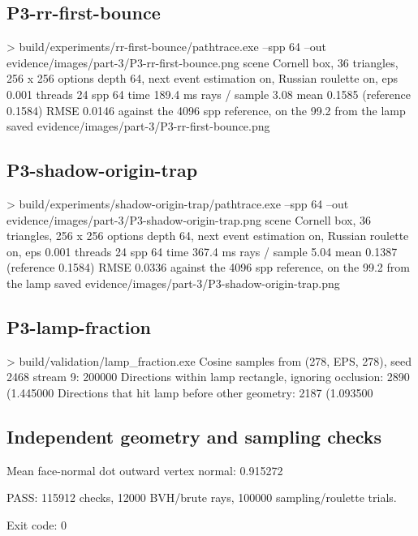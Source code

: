 \documentclass[11pt,a4paper]{article}
\begin{document}
\subsection*{P3-rr-first-bounce}
\begin{terminal}
> build/experiments/rr-first-bounce/pathtrace.exe --spp 64 --out
evidence/images/part-3/P3-rr-first-bounce.png
  scene          Cornell box, 36 triangles, 256 x 256
  options        depth 64, next event estimation on, Russian roulette on, eps 0.001
  threads        24
  spp            64
  time           189.4 ms
  rays / sample  3.08
  mean           0.1585  (reference 0.1584)
  RMSE           0.0146  against the 4096 spp reference, on the 99.2%
from the lamp
  saved          evidence/images/part-3/P3-rr-first-bounce.png
\end{terminal}
\subsection*{P3-shadow-origin-trap}
\begin{terminal}
> build/experiments/shadow-origin-trap/pathtrace.exe --spp 64 --out
evidence/images/part-3/P3-shadow-origin-trap.png
  scene          Cornell box, 36 triangles, 256 x 256
  options        depth 64, next event estimation on, Russian roulette on, eps 0.001
  threads        24
  spp            64
  time           367.4 ms
  rays / sample  5.04
  mean           0.1387  (reference 0.1584)
  RMSE           0.0336  against the 4096 spp reference, on the 99.2%
from the lamp
  saved          evidence/images/part-3/P3-shadow-origin-trap.png
\end{terminal}
\subsection*{P3-lamp-fraction}
\begin{terminal}
> build/validation/lamp_fraction.exe
Cosine samples from (278, EPS, 278), seed 2468 stream 9: 200000
Directions within lamp rectangle, ignoring occlusion: 2890 (1.445000%
Directions that hit lamp before other geometry: 2187 (1.093500%
\end{terminal}
\subsection*{Independent geometry and sampling checks}
\begin{terminal}
Mean face-normal dot outward vertex normal: 0.915272

PASS: 115912 checks, 12000 BVH/brute rays, 100000 sampling/roulette trials.


Exit code: 0
\end{terminal}
\label{report-last-page}
\end{document}
